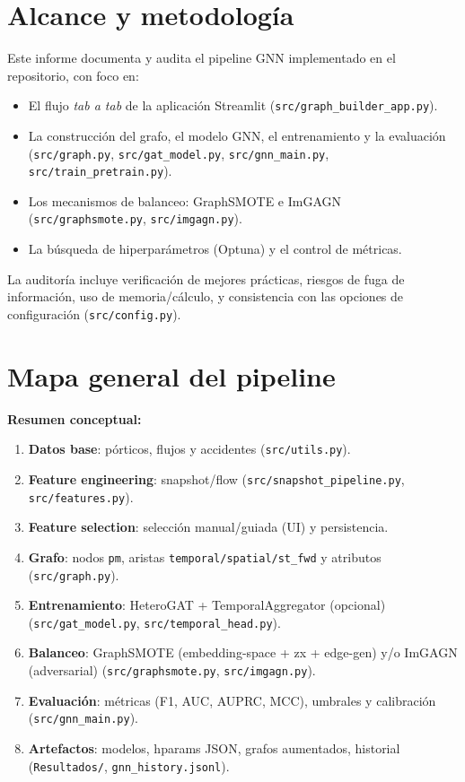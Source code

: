 \section{Alcance y metodolog\'ia}
Este informe documenta y audita el pipeline GNN implementado en el repositorio, con foco en:
\begin{itemize}[leftmargin=*]
  \item El flujo \emph{tab a tab} de la aplicaci\'on Streamlit (\texttt{src/graph\_builder\_app.py}).
  \item La construcci\'on del grafo, el modelo GNN, el entrenamiento y la evaluaci\'on (\texttt{src/graph.py}, \texttt{src/gat\_model.py}, \texttt{src/gnn\_main.py}, \texttt{src/train\_pretrain.py}).
  \item Los mecanismos de balanceo: GraphSMOTE e ImGAGN (\texttt{src/graphsmote.py}, \texttt{src/imgagn.py}).
  \item La b\'usqueda de hiperpar\'ametros (Optuna) y el control de m\'etricas.
\end{itemize}
La auditor\'ia incluye verificaci\'on de mejores pr\'acticas, riesgos de fuga de informaci\'on, uso de memoria/c\'alculo, y consistencia con las opciones de configuraci\'on (\texttt{src/config.py}).

\section{Mapa general del pipeline}
\textbf{Resumen conceptual:}
\begin{enumerate}[leftmargin=*]
  \item \textbf{Datos base}: p\'orticos, flujos y accidentes (\texttt{src/utils.py}).
  \item \textbf{Feature engineering}: snapshot/flow \textrm{(\texttt{src/snapshot\_pipeline.py}, \texttt{src/features.py})}.
  \item \textbf{Feature selection}: selecci\'on manual/guiada (UI) y persistencia.
  \item \textbf{Grafo}: nodos \texttt{pm}, aristas \texttt{temporal/spatial/st\_fwd} y atributos (\texttt{src/graph.py}).
  \item \textbf{Entrenamiento}: HeteroGAT + TemporalAggregator (opcional) (\texttt{src/gat\_model.py}, \texttt{src/temporal\_head.py}).
  \item \textbf{Balanceo}: GraphSMOTE (embedding-space + z\textrm{\textrightarrow}x + edge-gen) y/o ImGAGN (adversarial) (\texttt{src/graphsmote.py}, \texttt{src/imgagn.py}).
  \item \textbf{Evaluaci\'on}: m\'etricas (F1, AUC, AUPRC, MCC), umbrales y calibraci\'on (\texttt{src/gnn\_main.py}).
  \item \textbf{Artefactos}: modelos, hparams JSON, grafos aumentados, historial (\texttt{Resultados/}, \texttt{gnn\_history.jsonl}).
\end{enumerate}

